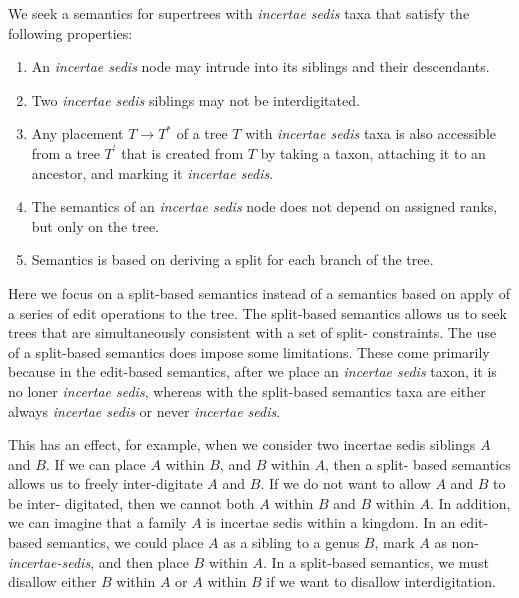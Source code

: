 \documentclass[english]{article}
\begin{document}
We seek a semantics for supertrees with \emph{incertae sedis }taxa
that satisfy the following properties:
\begin{enumerate}
    \item An \emph{incertae sedis} node may intrude into its siblings and their
descendants.
    \item Two \emph{incertae sedis} siblings may not be
interdigitated.
    \item Any placement $T\to T^{*}$ of a tree $T$ with
\emph{incertae sedis} taxa is also accessible from a tree $T^{\prime}$
that is created from $T$ by taking a taxon, attaching it to an
ancestor, and marking it \emph{incertae sedis}. 
    \item The semantics of an
\emph{incertae sedis} node does not depend on assigned ranks, but only
on the tree.
    \item Semantics is based on deriving a split for each
branch of the tree.
\end{enumerate}
Here we focus on a split-based
semantics instead of a semantics based on apply of a series of edit
operations to the tree.
The split-based semantics allows us to seek
trees that are simultaneously consistent with a set of split-
constraints.
The use of a split-based semantics does impose some
limitations.
These come primarily because in the edit-based semantics,
after we place an \emph{incertae sedis} taxon, it is no loner
\emph{incertae sedis}, whereas with the split-based semantics taxa are
either always \emph{incertae sedis} or never \emph{incertae sedis}.

This has an effect, for example, when we consider two incertae sedis
siblings $A$ and $B$.
If we can place $A$ within $B$, and $B$ within
$A$, then a split- based semantics allows us to freely inter-digitate
$A$ and $B$.
If we do not want to allow $A$ and $B$ to be inter-
digitated, then we cannot both $A$ within $B$ and $B$ within $A$.
In
addition, we can imagine that a family $A$ is incertae sedis within a
kingdom.
In an edit-based semantics, we could place $A$ as a sibling
to a genus $B$, mark $A$ as non-\emph{incertae-sedis}, and then place
$B$ within $A$.
In a split-based semantics, we must disallow either
$B$ within $A$ or $A$ within $B$ if we want to disallow
interdigitation.
\end{document}
